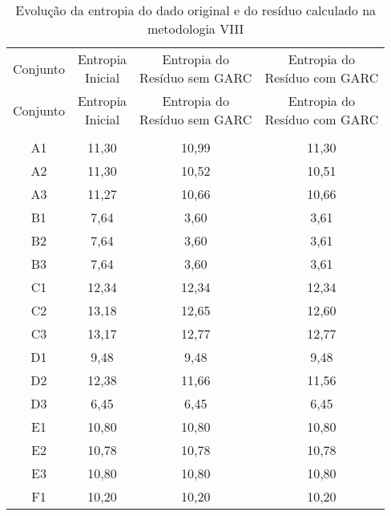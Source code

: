 \clearpage

\begin{center}
\begin{longtable}{cccc}
\toprule
\rowcolor{white}
\caption[Metodologia VIII: evolução da entropia]{Evolução da entropia do dado
original e do resíduo calculado na metodologia VIII}
\label{tab:EvolucaoEntropiaMet8}\\
\midrule
Conjunto & \specialcell{Entropia \\Inicial} & \specialcell{Entropia do
\\Resíduo sem GARC} & \specialcell{Entropia do
\\Resíduo com GARC}  \\
\midrule
\endfirsthead
\midrule
\rowcolor{white}
Conjunto & \specialcell{Entropia \\Inicial} & \specialcell{Entropia do
\\Resíduo sem GARC} & \specialcell{Entropia do
\\Resíduo com GARC}  \\
\toprule
\endhead
\midrule \\ %
\endfoot
\bottomrule 
\endlastfoot
    A1    & 11,30 & 10,99 & 11,30 \\
    A2    & 11,30 & 10,52 & 10,51 \\
    A3    & 11,27 & 10,66 & 10,66 \\
    B1    & 7,64  & 3,60  & 3,61 \\
    B2    & 7,64  & 3,60  & 3,61 \\
    B3    & 7,64  & 3,60  & 3,61 \\
    C1    & 12,34 & 12,34 & 12,34 \\
    C2    & 13,18 & 12,65 & 12,60 \\
    C3    & 13,17 & 12,77 & 12,77 \\
    D1    & 9,48  & 9,48  & 9,48 \\
    D2    & 12,38 & 11,66 & 11,56 \\
    D3    & 6,45  & 6,45  & 6,45 \\
    E1    & 10,80 & 10,80 & 10,80 \\
    E2    & 10,78 & 10,78 & 10,78 \\
    E3    & 10,80 & 10,80 & 10,80 \\
    F1    & 10,20 & 10,20 & 10,20 \\

\end{longtable}
\end{center}
